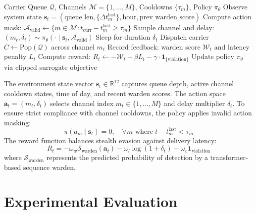 \documentclass[11pt,journal,onecolumn]{IEEEtran}\linespread{1.3}
\begin{document}
\begin{algorithm}[t]
\caption{PPO Action-Masked Stealth Scheduling}
\label{alg:ppo}
\begin{algorithmic}[1]
\REQUIRE Carrier Queue $\mathcal{Q}$, Channels $\mathcal{M} = \{1, \dots, M\}$, Cooldowns $\{\tau_m\}$, Policy $\pi_{\theta}$
    \STATE Observe system state $\mathbf{s}_t = (\text{queue\_len}, \{\Delta t_m^{\text{last}}\}, \text{hour}, \text{prev\_warden\_score})$
    \STATE Compute action mask: $\mathcal{A}_{\text{valid}} \leftarrow \{m \in \mathcal{M} : t_{\text{curr}} - t_m^{\text{last}} \ge \tau_m\}$
    \STATE Sample channel and delay: $(m_t, \delta_t) \sim \pi_{\theta}(\cdot \mid \mathbf{s}_t, \mathcal{A}_{\text{valid}})$
    \STATE Sleep for duration $\delta_t$
    \STATE Dispatch carrier $C \leftarrow \text{Pop}(\mathcal{Q})$ across channel $m_t$
    \STATE Record feedback: warden score $\mathcal{W}_t$ and latency penalty $L_t$
    \STATE Compute reward: $R_t \leftarrow -\mathcal{W}_t - \beta L_t - \gamma \cdot \mathbf{1}_{\{\text{violation}\}}$
    \STATE Update policy $\pi_{\theta}$ via clipped surrogate objective
\ENDWHILE
\end{algorithmic}
\end{algorithm}

The environment state vector $\mathbf{s}_t \in \mathbb{R}^{12}$ captures queue depth, active channel cooldown states, time of day, and recent warden scores. The action space $\mathbf{a}_t = (m_t, \delta_t)$ selects channel index $m_t \in \{1, \dots, M\}$ and delay multiplier $\delta_t$. To ensure strict compliance with channel cooldowns, the policy applies invalid action masking:
\begin{equation}
\pi(a_m \mid \mathbf{s}_t) = 0, \quad \forall m \text{ where } t - t_m^{\text{last}} < \tau_m
\end{equation}
The reward function balances stealth evasion against delivery latency:
\begin{equation}
R_t = -\omega_w \mathcal{S}_{\text{warden}}(\mathbf{a}_t) - \omega_l \log(1 + \delta_t) - \omega_v \mathbf{1}_{\text{violation}}
\end{equation}
where $\mathcal{S}_{\text{warden}}$ represents the predicted probability of detection by a transformer-based sequence warden.

\section{Experimental Evaluation}
\end{document}

